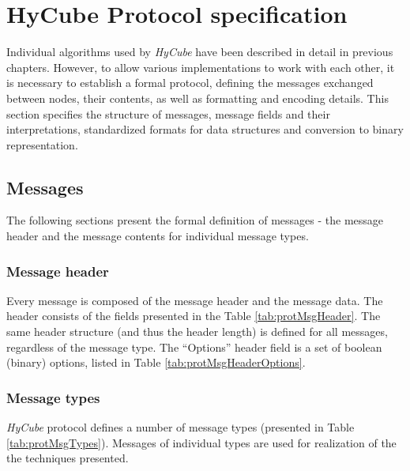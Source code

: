 
\chapter{HyCube Protocol specification}
\label{sec:protocol}

Individual algorithms used by \emph{HyCube} have been described in detail in previous chapters. However, to allow various implementations to work with each other, it is necessary to establish a formal protocol, defining the messages exchanged between nodes, their contents, as well as formatting and encoding details. This section specifies the structure of messages, message fields and their interpretations, standardized formats for data structures and conversion to binary representation.


\section{Messages}


The following sections present the formal definition of messages - the message header and the message contents for individual message types.


\subsection{Message header}




Every message is composed of the message header and the message data. The header consists of the fields presented in the Table \ref{tab:protMsgHeader}. The same header structure (and thus the header length) is defined for all messages, regardless of the message type. The ``Options'' header field is a set of boolean (binary) options, listed in Table \ref{tab:protMsgHeaderOptions}.









\subsection{Message types}
\label{sec:messageTypes}

\emph{HyCube} protocol defines a number of message types (presented in Table \ref{tab:protMsgTypes}). Messages of individual types are used for realization of the the techniques presented.

